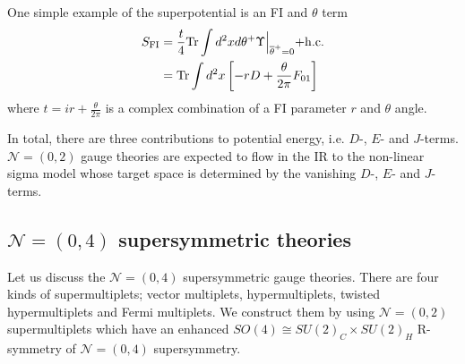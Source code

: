 \documentclass{article}
\numberwithin{equation}{section}
\begin{document}
One simple example of the superpotential is an FI and $\theta$ term 
\begin{align}
\label{02_FI}
S_{\mathrm{FI}}&=\frac{t}{4}\mathrm{Tr}\int d^{2}x d\theta^{+} \Upsilon\Bigl|_{\overline{\theta}^{+}=0}
 + \mathrm{h.c.}
\nonumber\\
&=\mathrm{Tr}
\int d^{2}x \left[
-rD+\frac{\theta}{2\pi}F_{01}
\right]
\end{align}
where $t=ir+\frac{\theta}{2\pi}$ is a complex combination of a FI parameter $r$ and $\theta$ angle. 

In total, there are three contributions to potential energy, i.e. $D$-, $E$- and $J$-terms. 
$\mathcal{N}=(0,2)$ gauge theories are expected to flow in the IR 
to the non-linear sigma model whose target space is determined 
by the vanishing $D$-, $E$- and $J$-terms. 



























\subsection{$\mathcal{N}=(0,4)$ supersymmetric theories}
\label{sssec_04}
Let us discuss the $\mathcal{N}=(0,4)$ supersymmetric gauge theories. 
There are four kinds of supermultiplets; 
vector multiplets, hypermultiplets, twisted hypermultiplets and Fermi multiplets. 
We construct them by using $\mathcal{N}=(0,2)$ supermultiplets 
which have an enhanced $SO(4)\cong SU(2)_{C}\times SU(2)_{H}$ R-symmetry of $\mathcal{N}=(0,4)$ supersymmetry. 
\end{document}
